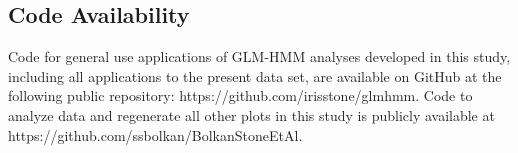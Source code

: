 \subsection{Code Availability}
\label{sec:ap1:m14}
Code for general use applications of GLM-HMM analyses developed in this study, including all applications to the present data set, are available on GitHub at the following public repository: https://github.com/irisstone/glmhmm. Code to analyze data and regenerate all other plots in this study is publicly available at https://github.com/ssbolkan/BolkanStoneEtAl.